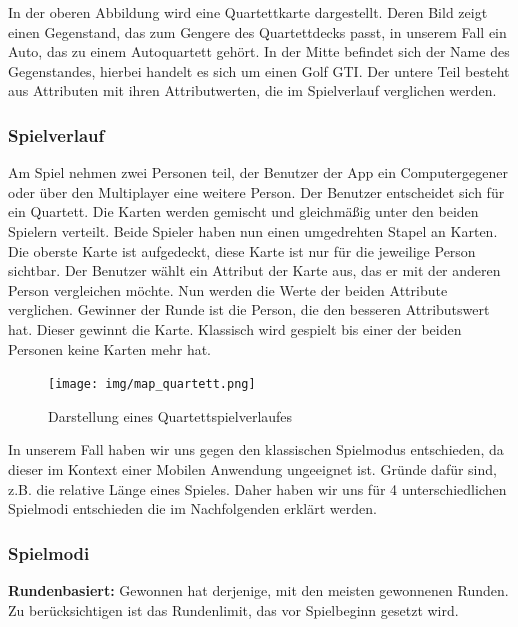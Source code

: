 \documentclass{scrartcl}
\begin{document}
In der oberen Abbildung wird eine Quartettkarte dargestellt. Deren Bild zeigt
einen Gegenstand, das zum Gengere des Quartettdecks passt, in unserem Fall ein
Auto, das zu einem Autoquartett gehört. In der Mitte befindet sich der Name des
Gegenstandes, hierbei handelt es sich um einen Golf GTI. Der untere Teil besteht
aus Attributen mit ihren Attributwerten, die im Spielverlauf verglichen werden.

\subsubsection{Spielverlauf}

Am Spiel nehmen zwei Personen teil, der Benutzer der App ein Computergegener
oder über den Multiplayer eine weitere Person. Der Benutzer entscheidet sich für
ein Quartett. Die Karten werden gemischt und gleichmäßig unter den beiden
Spielern verteilt. Beide Spieler haben nun einen umgedrehten Stapel an Karten.
Die oberste Karte ist aufgedeckt, diese Karte ist nur für die jeweilige Person
sichtbar. Der Benutzer wählt ein Attribut der Karte aus, das er mit der anderen
Person vergleichen möchte. Nun werden die Werte der beiden Attribute verglichen.
Gewinner der Runde ist die Person, die den besseren Attributswert hat. Dieser
gewinnt die Karte. Klassisch wird gespielt bis einer der beiden Personen keine
Karten mehr hat.

\begin{figure}[!ht]
\begin{center}
    \texttt{[image: img/map\_quartett.png]}
    \caption{Darstellung eines Quartettspielverlaufes}
\end{center}
\end{figure}

In unserem Fall haben wir uns gegen den klassischen Spielmodus entschieden, da
dieser im Kontext einer Mobilen Anwendung ungeeignet ist. Gründe dafür sind,
z.B. die relative Länge eines Spieles.
\newline
Daher haben wir uns für 4 unterschiedlichen Spielmodi entschieden die im
Nachfolgenden erklärt werden.

\subsubsection{Spielmodi}

\textbf{Rundenbasiert:}
Gewonnen hat derjenige, mit den meisten gewonnenen Runden. Zu berücksichtigen
ist das Rundenlimit, das vor Spielbeginn gesetzt wird.
\end{document}
